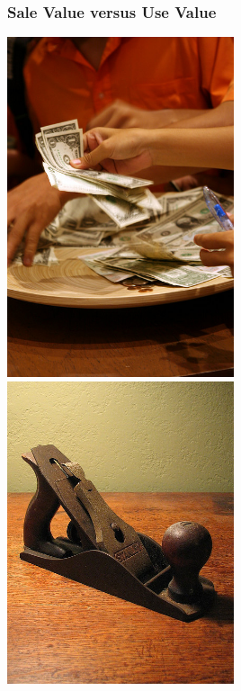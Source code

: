 \documentclass[18pt]{beamer}
\begin{document}
\begin{frame}[plain]
\frametitle{Sale Value versus Use Value}
  \includegraphics[width=0.5\textwidth,height=\paperheight]{../Art/2672465894_5b21e12135_z.jpg}
  \includegraphics[width=0.5\textwidth,height=\paperheight]{../Art/4293485922_7474ef04ce_z.jpg}
\end{frame}
\end{document}

